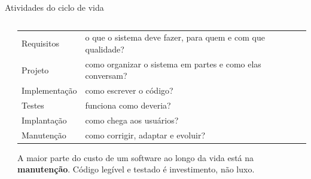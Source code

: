 \documentclass[aspectratio=169,10pt]{beamer}
\begin{document}
\begin{frame}{Atividades do ciclo de vida}
  \begin{columns}[c]
    \begin{column}{0.48\textwidth}
      \centering
    \end{column}
    \begin{column}{0.5\textwidth}
      \scriptsize
      \begin{tabularx}{\linewidth}{@{}l L@{}}
        \toprule
         &  \\
        \midrule
        Requisitos & o que o sistema deve fazer, para quem e com que qualidade? \\
        Projeto & como organizar o sistema em partes e como elas conversam? \\
        Implementação & como escrever o código? \\
        Testes & funciona como deveria? \\
        Implantação & como chega aos usuários? \\
        Manutenção & como corrigir, adaptar e evoluir? \\
        \bottomrule
      \end{tabularx}
      \begin{atencao}
        A maior parte do custo de um software ao longo da vida está na \textbf{manutenção}. Código legível e testado é investimento, não luxo.
      \end{atencao}
    \end{column}
  \end{columns}
\end{frame}
\end{document}
